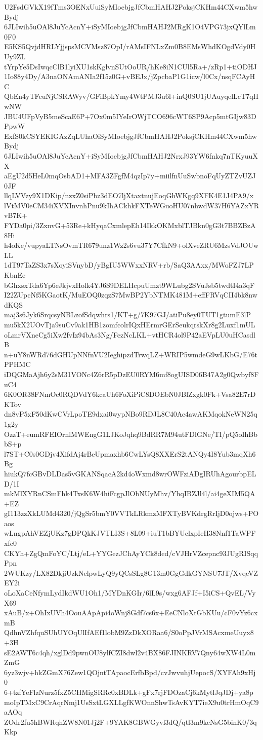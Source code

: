 U2FsdGVkX19fTms3OENxUuiSyMIoebjgJfCbmHAHJ2PoksjCKHm44CXwm5hwBydj
6JLIwih5uOAl8JuYcAcnY+iSyMIoebjgJfCbmHAHJ2MRgK1O4VPG73jxQYlLm0F0
E5KS5QvjdHRLYjjspsMCVMsz87OpI/rAMsIFNLxZm0B8EMsWhdKOgdVdy0HUy9ZL
tYrpYe5DsIwqcClB1lyiXU1skKglvnSUtOoUR/hKe8iN1CUl5Ra+/zRp1+tiODHJ
1Io88y4Dy/A3naONAmANIa2f15z0G+vBEJx/jZpcbaP1G1icw/l0Cx/nsqFCAyHC
QbEn4yTFcuNjCSRAWyv/GFiBpkYmy4WtPMJ3u6l+inQ0SU1jUAuyqelLcT7qHwNW
JBU4UFpVyB5meScaE6P+7Ox0m5IYeIrOWjTCO696cWT6SP9Acp5mtGIjw83DPpwW
ExfS0kCSYEKIGAzZqLUhaOiSyMIoebjgJfCbmHAHJ2PoksjCKHm44CXwm5hwBydj
6JLIwih5uOAl8JuYcAcnY+iSyMIoebjgJfCbmHAHJ2NrxJ93YW6fnkq7nTKyuuXX
aEgU2d5HeL0mqOsbAD1+MFA3ZFgfM4qzIp7y+miilfnUuSwbnoFqUyZTZvUZJ0JF
llqLVVzy9X1DKip/nzxZ0siPbz3dEO7ljXtaxtnujEoqGhWKgq9XFK4E1J4PA9/x
lVtMV0eCM34iXVXInvnhPnu9kIhACkhkFXTeWGuoHU07nhwdW37H6YAZxYRvB7K+
FYDa0pi/3ZxnvG+53Re+kHyqaCxmlepEh14IkkOKMxblTJBkn0gG3t7BBZBzA8Hi
h4oKe/vupyaLTNsOvmTR679unz1Wz2s6vu37Y7CfkN9+olXveZRU6MzsVdJOUwLL
1dT97TaZS3x7sXoyiSVnybD/yBgIU5WWxxNRV+rb/SaQ3AAxx/MWoFZJ7LPKbnEe
bGhxsxTda6Yp6eJkjvxHolk4YJ6S9DELHcpuUmzt9WLubg2SVuJsb5twdtI4a3qF
I22ZUpcNf5KGaotK/MuEOQ0zqzS7MwBP2YbNTMK481M+effFRVqCII4bk8nwdKQS
maj3s6Jyk6SrqcsyNBLzofSdqwhrs1/KT+g/7K97GJ/atiPu8ey0TUT1gtumE3lP
mu5kX2UOvTja9suCv9ak1HB1zomfcolrIQxHErmrGErSeukqrskXr8g2Luxf1mUL
oLmrVXneCg5iXw2fvIz94bAs3Ng/FczNcLKL+vtHCR4ol9P42aEVpLU0uHCasdlB
n+uY8nWRd76dGHUpNNfnVU2IeghipzdTrwqLZ+WRIP5wmdeG9wLKbG/E76tPPHMC
iDQGMaAjh6y2sM31VONc4Z6rR5pDzEU0RYM6mf8ogUISD06B47A2g0Qwbyf8FuC4
6K0OR38FNmOc0RQDVdY6kcaUh6FoXiPiC8DOEbN0JBlZxgk0Fk+Vsa82E7rDKTov
dn8vP5xF50dKwCVrLpoTE9dxai0wypNBo9RDJL8C40Ac4awAKMqokNeWN25q1g2y
OzzT+eumRFEIOrnlMWEngG1LJKoJqhq9BdRR7M94utFDlGNe/TI/pQ5oIhBbbS+p
l7ST+C0s0GDjv4XifdAj4rBeUpmaxhb6CwLYsQ8XXErS2tANQy4I8Yub3mqXh6Bg
hiukQ7fcGBvDLDas5vGKANSqacA2kd4oWxmd8wrOWFziADgIRUhAgourbpELD/1I
mkMlXYRnCSmFhk4TxsK6W4hiFcgpJlObNUyMhv/YhqIBZJl4l/ai4geXIM5QA+EZ
gI113zzXkLUMd4320/jQgSr5bmY0VVTkLRkmzMFXTyBVKdrgRrIjD0ojws+POaos
wLngpAhVEZjUKz7gDPQkKJVTLI3S+8L09+iuT1bBYUclxpIeH38Nnf1TaWPFxfc0
CKYh+ZgQmFoYC/Ltj/eL+YYGezJChAyYCk8ded/cVJHrVZcepnc93JUgRISqqPpn
2WUKzy/LX82DkjiUzkNelpwLyQ9yQCsSLg8G13m0GgGdkGYNSU73T/XvqeVZEY2i
oLoXaCeNfymLydIkdWU1Oh1/MYDnKGIr/6lL9s/wxg6AFJf+I5iCS+QvEL/VyX69
xAuB/x+OhIxUVh4OouAApApi4oWnj8Gdf7cs6x+EeCNloXtGbKUu/cF0vYz6cxmB
QdhnVZhfquSUhUYOqUlIfAEf1lobM9ZzDkXORaa6/S0oPpJVrMSAcxmeUuyx8+3H
sE2AWT6c4qh/xglDd9pwnOU8ylfCZI8dwl2v4BX86FJINKRV7Qny64wXW4L0mZmG
6yz3wjv+hkZGmX76Zew1QOjntTApaocErfbBpd/cvJwvuhjUepocS/XYFAh9xHj0
6+tzfYeFlzNurz5fxZ5CHMigSRRc0xBDLk+gFx7rjFDOzaCj6kMytlJqJDj+ya8p
moIpTMxC9CrAqrNmj1UsSxtLGXLLgfKWOnnShwTsAvKYT7ieX9u0trHmOqC9aAOq
ZOdr2fu5hBWRqhZW8N01Jj2F+9YAK8GBWGyvl3dQ/qtl3m9kcNsG5binK0/3qKkp
